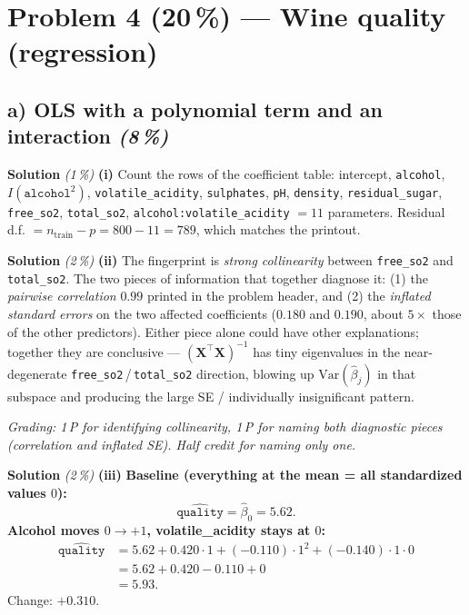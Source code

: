 \documentclass[11pt,a4paper]{article}
\newcommand{\points}[1]{\textbf{(#1\,\%)}}
\newcommand{\subpoints}[1]{\textit{(#1\,\%)}}
\newcommand{\sol}{\noindent\textbf{Solution}}
\begin{document}
\section*{Problem 4 \points{20} --- Wine quality (regression)}

\subsection*{a) OLS with a polynomial term and an interaction \subpoints{8}}

\sol{} \subpoints{1} \textbf{(i)} Count the rows of the coefficient table: intercept,
\texttt{alcohol}, $I(\texttt{alcohol}^2)$, \texttt{volatile\_acidity}, \texttt{sulphates},
\texttt{pH}, \texttt{density}, \texttt{residual\_sugar}, \texttt{free\_so2}, \texttt{total\_so2},
\texttt{alcohol:volatile\_acidity} $= \boxed{11}$ parameters. Residual d.f.
$= n_{\text{train}} - p = 800 - 11 = 789$, which matches the printout. \checkmark

\medskip
\sol{} \subpoints{2} \textbf{(ii)} The fingerprint is \emph{strong collinearity} between
\texttt{free\_so2} and \texttt{total\_so2}. The two pieces of information that together diagnose
it: (1) the \emph{pairwise correlation} $0.99$ printed in the problem header, and (2) the
\emph{inflated standard errors} on the two affected coefficients ($0.180$ and $0.190$, about
$5\times$ those of the other predictors). Either piece alone could have other explanations;
together they are conclusive --- $(\mathbf X^\top\mathbf X)^{-1}$ has tiny eigenvalues in the
near-degenerate \texttt{free\_so2}\,/\,\texttt{total\_so2} direction, blowing up $\mathrm{Var}(\hat\beta_j)$
in that subspace and producing the large SE / individually insignificant pattern.

\noindent\emph{Grading: 1\,P for identifying collinearity, 1\,P for naming both diagnostic pieces
(correlation \emph{and} inflated SE). Half credit for naming only one.}

\medskip
\sol{} \subpoints{2} \textbf{(iii)} \textbf{Baseline (everything at the mean = all standardized
values $0$):}
$$\widehat{\texttt{quality}} = \hat\beta_0 = \boxed{5.62}.$$
\textbf{Alcohol moves $0 \to +1$, volatile\_acidity stays at $0$:}
\begin{align*}
\widehat{\texttt{quality}}
   &= 5.62 + 0.420\cdot 1 + (-0.110)\cdot 1^2 + (-0.140)\cdot 1\cdot 0 \\
   &= 5.62 + 0.420 - 0.110 + 0 \\
   &= \boxed{5.93}.
\end{align*}
Change: $+0.310$.
\end{document}
